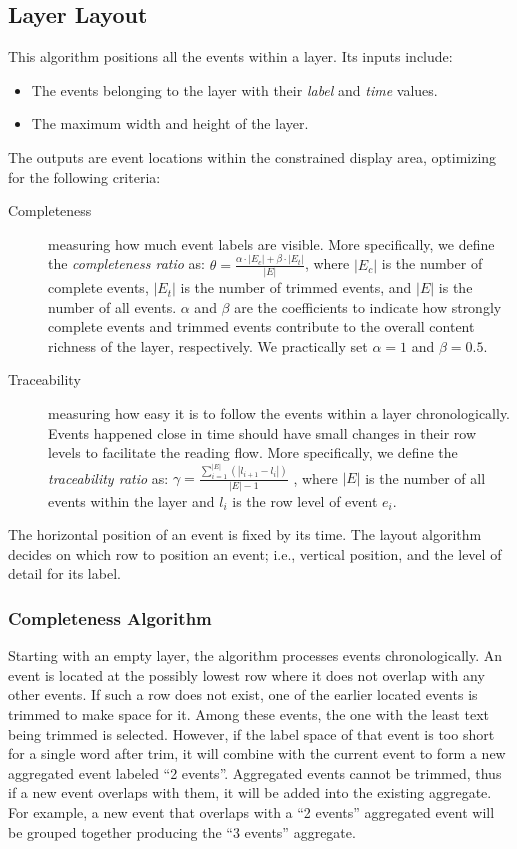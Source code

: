 \subsection{Layer Layout}
This algorithm positions all the events within a layer. Its inputs include:
\begin{itemize}
	\item The events belonging to the layer with their \emph{label} and \emph{time} values.
	\item The maximum width and height of the layer.
\end{itemize}
The outputs are event locations within the constrained display area, optimizing for the following criteria:
\begin{description}
	\item[Completeness] measuring how much event labels are visible. More specifically, we define the \emph{completeness ratio} as:
	$\theta = \frac{\alpha \cdot |E_c| + \beta \cdot |E_t|}{|E|}$, where $|E_c|$ is the number of complete events, $|E_t|$ is the number of trimmed events, and $|E|$ is the number of all events. $\alpha$ and $\beta$ are the coefficients to indicate how strongly complete events and trimmed events contribute to the overall content richness of the layer, respectively. We practically set $\alpha=1$ and $\beta=0.5$.
	
	\item[Traceability] measuring how easy it is to follow the events within a layer chronologically. Events happened close in time should have small changes in their row levels to facilitate the reading flow. More specifically, we define the \emph{traceability ratio} as:
	$\gamma=\frac{\sum\limits_{i=1}^{|E|}(|l_{i+1} - l_i|)}{|E|-1}$	, where $|E|$ is the number of all events within the layer and $l_i$ is the row level of event $e_i$. 	
\end{description}

The horizontal position of an event is fixed by its time. The layout algorithm decides on which row to position an event; i.e., vertical position,  and the level of detail for its label.

\subsubsection{Completeness Algorithm}
Starting with an empty layer, the algorithm processes events chronologically. An event is located at the possibly lowest row where it does not overlap with any other events. If such a row does not exist, one of the earlier located events is trimmed to make space for it. Among these events, the one with the least text being trimmed is selected. However, if the label space of that event is too short for a single word after trim, it will combine with the current event to form a new aggregated event labeled ``2 events''. Aggregated events cannot be trimmed, thus if a new event overlaps with them, it will be added into the existing aggregate. For example, a new event that overlaps with a ``2 events'' aggregated event will be grouped together producing the ``3 events'' aggregate. 

